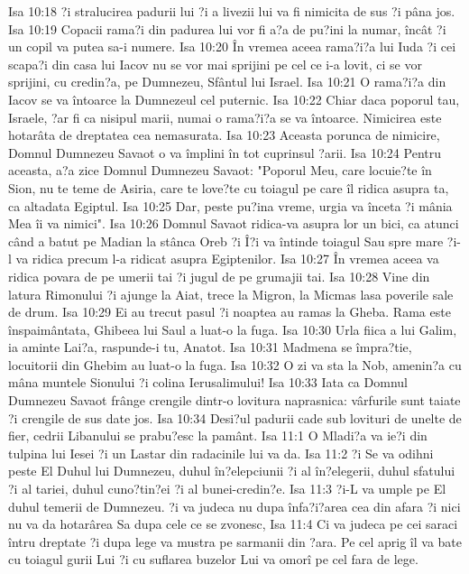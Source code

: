 Isa 10:18  ?i stralucirea padurii lui ?i a livezii lui va fi nimicita de sus ?i pâna jos.
Isa 10:19  Copacii rama?i din padurea lui vor fi a?a de pu?ini la numar, încât ?i un copil va putea sa-i numere.
Isa 10:20  În vremea aceea rama?i?a lui Iuda ?i cei scapa?i din casa lui Iacov nu se vor mai sprijini pe cel ce i-a lovit, ci se vor sprijini, cu credin?a, pe Dumnezeu, Sfântul lui Israel.
Isa 10:21  O rama?i?a din Iacov se va întoarce la Dumnezeul cel puternic.
Isa 10:22  Chiar daca poporul tau, Israele, ?ar fi ca nisipul marii, numai o rama?i?a se va întoarce. Nimicirea este hotarâta de dreptatea cea nemasurata.
Isa 10:23  Aceasta porunca de nimicire, Domnul Dumnezeu Savaot o va împlini în tot cuprinsul ?arii.
Isa 10:24  Pentru aceasta, a?a zice Domnul Dumnezeu Savaot: "Poporul Meu, care locuie?te în Sion, nu te teme de Asiria, care te love?te cu toiagul pe care îl ridica asupra ta, ca altadata Egiptul.
Isa 10:25  Dar, peste pu?ina vreme, urgia va înceta ?i mânia Mea îi va nimici".
Isa 10:26  Domnul Savaot ridica-va asupra lor un bici, ca atunci când a batut pe Madian la stânca Oreb ?i Î?i va întinde toiagul Sau spre mare ?i-l va ridica precum l-a ridicat asupra Egiptenilor.
Isa 10:27  În vremea aceea va ridica povara de pe umerii tai ?i jugul de pe grumajii tai.
Isa 10:28  Vine din latura Rimonului ?i ajunge la Aiat, trece la Migron, la Micmas lasa poverile sale de drum.
Isa 10:29  Ei au trecut pasul ?i noaptea au ramas la Gheba. Rama este înspaimântata, Ghibeea lui Saul a luat-o la fuga.
Isa 10:30  Urla fiica a lui Galim, ia aminte Lai?a, raspunde-i tu, Anatot.
Isa 10:31  Madmena se împra?tie, locuitorii din Ghebim au luat-o la fuga.
Isa 10:32  O zi va sta la Nob, amenin?a cu mâna muntele Sionului ?i colina Ierusalimului!
Isa 10:33  Iata ca Domnul Dumnezeu Savaot frânge crengile dintr-o lovitura naprasnica: vârfurile sunt taiate ?i crengile de sus date jos.
Isa 10:34  Desi?ul padurii cade sub lovituri de unelte de fier, cedrii Libanului se prabu?esc la pamânt.
Isa 11:1  O Mladi?a va ie?i din tulpina lui Iesei ?i un Lastar din radacinile lui va da.
Isa 11:2  ?i Se va odihni peste El Duhul lui Dumnezeu, duhul în?elepciunii ?i al în?elegerii, duhul sfatului ?i al tariei, duhul cuno?tin?ei ?i al bunei-credin?e.
Isa 11:3  ?i-L va umple pe El duhul temerii de Dumnezeu. ?i va judeca nu dupa înfa?i?area cea din afara ?i nici nu va da hotarârea Sa dupa cele ce se zvonesc,
Isa 11:4  Ci va judeca pe cei saraci întru dreptate ?i dupa lege va mustra pe sarmanii din ?ara. Pe cel aprig îl va bate cu toiagul gurii Lui ?i cu suflarea buzelor Lui va omorî pe cel fara de lege.
